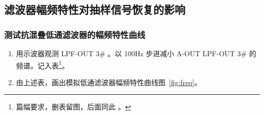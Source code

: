 \documentclass[../main]{subfiles}
\begin{document}

\subsection{滤波器幅频特性对抽样信号恢复的影响}%
\label{sub:freq}


\subsubsection{测试抗混叠低通滤波器的幅频特性曲线}%
\label{ssub:lp}



  \begin{enumerate}
    \item 用示波器观测 LPF-OUT 3\# 。以 100Hz 步进减小
      A-OUT LPF-OUT 3\# 的频谱。记入表\footnote{篇幅要求，删表留图，后面同此
      。}。
    \item 由上述表，画出模拟低通滤波器幅频特性曲线图~\ref{fig:freq}。
  \end{enumerate}

\end{document}
